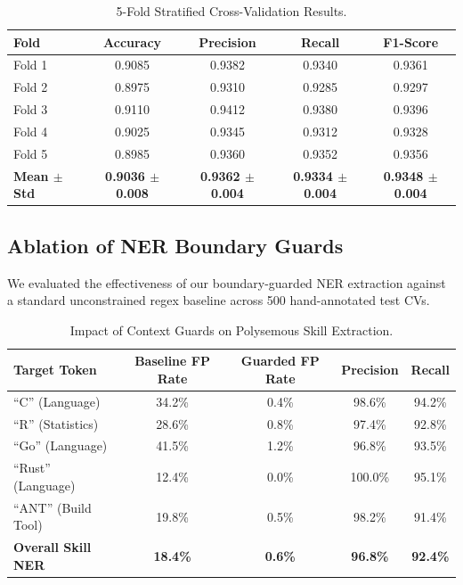 \documentclass[conference]{IEEEtran}
\begin{document}
\begin{table}[htbp]
\caption{5-Fold Stratified Cross-Validation Results.}
\begin{center}
\begin{tabular}{lcccc}
\toprule
\textbf{Fold} & \textbf{Accuracy} & \textbf{Precision} & \textbf{Recall} & \textbf{F1-Score} \\
\midrule
Fold 1 & 0.9085 & 0.9382 & 0.9340 & 0.9361 \\
Fold 2 & 0.8975 & 0.9310 & 0.9285 & 0.9297 \\
Fold 3 & 0.9110 & 0.9412 & 0.9380 & 0.9396 \\
Fold 4 & 0.9025 & 0.9345 & 0.9312 & 0.9328 \\
Fold 5 & 0.8985 & 0.9360 & 0.9352 & 0.9356 \\
\midrule
\textbf{Mean $\pm$ Std} & \textbf{0.9036 $\pm$ 0.008} & \textbf{0.9362 $\pm$ 0.004} & \textbf{0.9334 $\pm$ 0.004} & \textbf{0.9348 $\pm$ 0.004} \\
\bottomrule
\end{tabular}
\label{tab:c1_cv}
\end{center}
\end{table}

\subsection{Ablation of NER Boundary Guards}
We evaluated the effectiveness of our boundary-guarded NER extraction against a standard unconstrained regex baseline across 500 hand-annotated test CVs.

\begin{table}[htbp]
\caption{Impact of Context Guards on Polysemous Skill Extraction.}
\begin{center}
\begin{tabular}{lcccc}
\toprule
\textbf{Target Token} & \textbf{Baseline FP Rate} & \textbf{Guarded FP Rate} & \textbf{Precision} & \textbf{Recall} \\
\midrule
``C'' (Language)       & 34.2\% & 0.4\% & 98.6\% & 94.2\% \\
``R'' (Statistics)     & 28.6\% & 0.8\% & 97.4\% & 92.8\% \\
``Go'' (Language)      & 41.5\% & 1.2\% & 96.8\% & 93.5\% \\
``Rust'' (Language)    & 12.4\% & 0.0\% & 100.0\% & 95.1\% \\
``ANT'' (Build Tool)   & 19.8\% & 0.5\% & 98.2\% & 91.4\% \\
\midrule
\textbf{Overall Skill NER} & \textbf{18.4\%} & \textbf{0.6\%} & \textbf{96.8\%} & \textbf{92.4\%} \\
\bottomrule
\end{tabular}
\label{tab:c1_ner_ablation}
\end{center}
\end{table}
\end{document}
